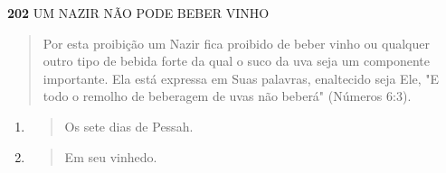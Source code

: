 \textbf{202} UM NAZIR NÃO PODE BEBER VINHO

\begin{quote}
Por esta proibição um Nazir fica proibido de beber vinho ou qual­quer
outro tipo de bebida forte da qual o suco da uva seja um componente
importante. Ela está expressa em Suas palavras, enaltecido seja Ele, "E
todo o remolho de beberagem de uvas não beberá" (Números 6:3).
\end{quote}

\begin{enumerate}
\def\labelenumi{\arabic{enumi}.}
\setcounter{enumi}{373}
\item
  \begin{quote}
  Os sete dias de Pessah.
  \end{quote}
\item
  \begin{quote}
  Em seu vinhedo.
  \end{quote}
\end{enumerate}

